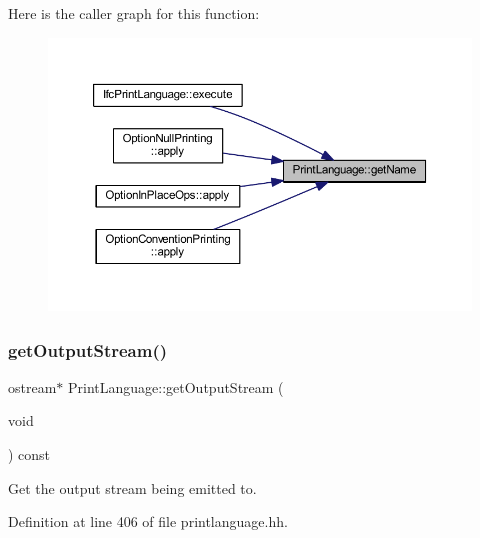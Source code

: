 Here is the caller graph for this function\+:
\nopagebreak
\begin{figure}[H]
\begin{center}
\leavevmode
\includegraphics[width=350pt]{class_print_language_a1818312d92f647fd01a0d38992b1e0c1_icgraph}
\end{center}
\end{figure}
\mbox{\label{class_print_language_a6f3c67db2f14e4a8ef13697c28a0a429}} 
\subsubsection{\texorpdfstring{getOutputStream()}{getOutputStream()}}
{\footnotesize\ttfamily ostream$\ast$ Print\+Language\+::get\+Output\+Stream (\begin{DoxyParamCaption}\item[{void}]{ }\end{DoxyParamCaption}) const\hspace{0.3cm}{\ttfamily [inline]}}



Get the output stream being emitted to. 



Definition at line 406 of file printlanguage.\+hh.

